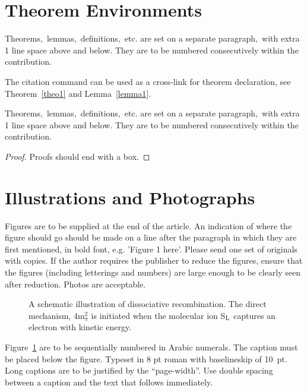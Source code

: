 \documentclass{ijcs_template}
\begin{document}
\section{Theorem Environments}

\begin{theorem}
\label{theo1}
Theorems$,$ lemmas$,$ definitions$,$ etc. are set on a separate
paragraph$,$ with extra 1 line space above and below. They are to be
numbered consecutively within the contribution.
\end{theorem}

The citation command can be used as a cross-link for theorem
declaration, see Theorem~\ref{theo1} and Lemma~\ref{lemma1}.

\begin{lemma}
\label{lemma1}
Theorems$,$ lemmas$,$ definitions$,$ etc. are set on a separate
paragraph$,$ with extra 1 line space above and below. They are to be
numbered consecutively within the contribution.
\end{lemma}

\begin{proof}
Proofs should end with a box.
\end{proof}

\section{Illustrations and Photographs}
Figures are to be supplied at the end of the article. An indication
of where the figure should go should be made on a line after the
paragraph in which they are first mentioned, in bold font, e.g.
'Figure 1 here'.  Please send one set of originals with copies. If
the author requires the publisher to reduce the figures, ensure that
the figures (including letterings and numbers) are large enough to
be clearly seen after reduction. Photos are acceptable.

\begin{figure}[th]
\centerline{}
\vspace*{8pt}
\caption{A schematic illustration of dissociative recombination. The
direct mechanism, 4m$^2_\pi$ is initiated when the molecular ion
S$_{\rm L}$ captures an electron with kinetic energy.\label{one}}
\end{figure}

Figure~\ref{one} are to be sequentially numbered in Arabic
numerals. The caption must be placed below the figure. Typeset in 8 pt
roman with baselineskip of 10~pt. Long captions are to be justified by
the ``page-width''.  Use double spacing between a caption and the text
that follows immediately.
\end{document}
